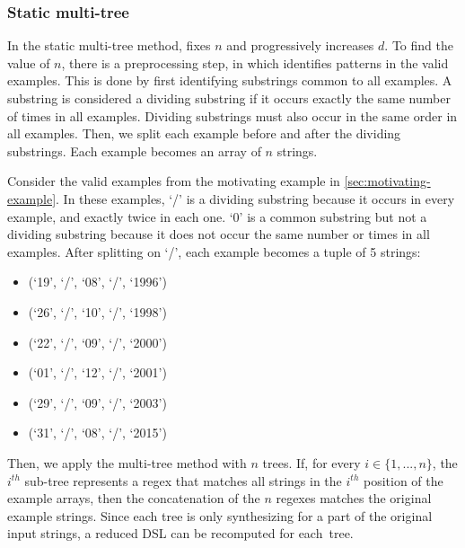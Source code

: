 \subsubsection{Static multi-tree} \label{sec:static-multi-tree} In the static multi-tree method, \Forest{} fixes \(n\) and progressively increases \(d\). To find the value of \(n\), there is a preprocessing step, in which \Forest{} identifies patterns in the valid examples. This is done by first identifying substrings common to all examples. A substring is considered a dividing substring if it occurs exactly the same number of times in all examples. Dividing substrings must also occur in the same order in all examples. Then, we split each example before and after the dividing substrings. Each example becomes an array of \(n\) strings.

\begin{example}\label{ex:splitting}
Consider the valid examples from the motivating example in \autoref{sec:motivating-example}.
%
In these examples, `/' is a dividing substring because it occurs in every example, and exactly twice in each one. `0' is a common substring but not a dividing substring because it does not occur the same number or times in all examples. After splitting on `/', each example becomes a tuple of 5 strings:

\begin{multicols}{3}
    \begin{itemize}[label={}]
    \item (`19', `/', `08', `/', `1996')
    \item (`26', `/', `10', `/', `1998')
    \item (`22', `/', `09', `/', `2000')
    \item (`01', `/', `12', `/', `2001')
    \item (`29', `/', `09', `/', `2003')
    \item (`31', `/', `08', `/', `2015')
    \end{itemize}
\end{multicols}
\end{example}
%
\noindent
Then, we apply the multi-tree method with \(n\) trees. If, for every \(i \in \{1, ..., n\}\), the \(i^{th}\) sub-tree represents a regex that matches all strings in the \(i^{th}\) position of the example arrays, then the concatenation of the \(n\) regexes matches the original example strings.
%
Since each tree is only synthesizing for a part of the original input strings, a reduced DSL can be recomputed for each~tree. %

